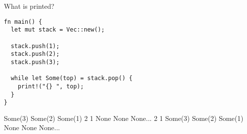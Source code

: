 %
%
What is printed?
\begin{lstlisting}
fn main() {
  let mut stack = Vec::new();

  stack.push(1);
  stack.push(2);
  stack.push(3);

  while let Some(top) = stack.pop() {
    print!("{} ", top);
  }
}
\end{lstlisting}
  \choice Some(3) Some(2) Some(1)
   2 1 None None None...
   2 1
  \choice Some(3) Some(2) Some(1) None None None...
